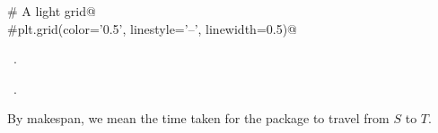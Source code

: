 \documentclass[10.0pt]{report}
\begin{document}
\begin{flushleft}
\begin{list}{}{}
\mbox{}\verb@    # A light grid@\\
\mbox{}\verb@    #plt.grid(color='0.5', linestyle='--', linewidth=0.5)@\\
\mbox{}\verb@@{\NWsep}
\end{list}
\vspace{-1.5ex}
\footnotesize
\begin{list}{}{\setlength{\itemsep}{-\parsep}\setlength{\itemindent}{-\leftmargin}}
\item \NWtxtMacroDefBy\ .
\item \NWtxtMacroRefIn\ .

\item{}
\end{list}
\vspace{4ex}
\end{flushleft}


By makespan, we mean the time taken for the package to travel from $S$ to $T$.
\end{document}
